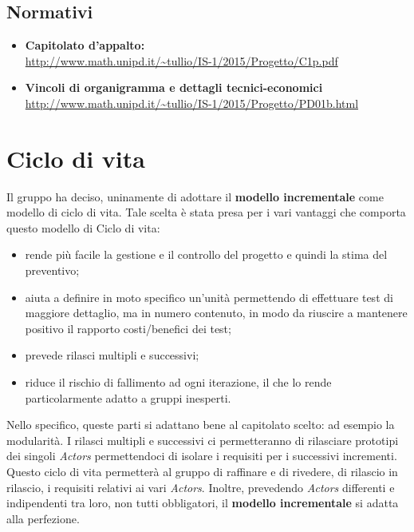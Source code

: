\documentclass[a4paper]{report}
\begin{document}
			\subsection{Normativi}
				\begin{itemize}
					\item \textbf{Capitolato d'appalto: } \\ \url{http://www.math.unipd.it/~tullio/IS-1/2015/Progetto/C1p.pdf}
					\item \textbf{Vincoli di organigramma e dettagli tecnici-economici} \\ 
					\url{http://www.math.unipd.it/~tullio/IS-1/2015/Progetto/PD01b.html}
				\end{itemize}
		\section{Ciclo di vita}
			Il gruppo ha deciso, uninamente di adottare il \textbf{modello incrementale} come modello di ciclo di vita.
			Tale scelta è stata presa per i vari vantaggi che comporta questo modello di Ciclo di vita:
			\begin{itemize}
				\item rende più facile la gestione e il controllo del progetto e quindi la stima del preventivo;
				\item aiuta a definire in moto specifico un'unità permettendo di effettuare test di maggiore dettaglio, ma 
				in numero contenuto, in modo da riuscire a mantenere positivo il rapporto costi/benefici dei test;
				\item prevede rilasci multipli e successivi;
				\item riduce il rischio di fallimento ad ogni iterazione, il che lo rende particolarmente adatto a gruppi 
				inesperti.
			\end{itemize}
			
			Nello specifico, queste parti si adattano bene al capitolato scelto: ad esempio la modularità. I rilasci 
			multipli e successivi ci permetteranno di rilasciare prototipi dei singoli \emph{Actors} permettendoci di
			isolare i requisiti per i successivi incrementi. Questo ciclo di vita permetterà al gruppo di raffinare e 
			di rivedere, di rilascio in rilascio, i requisiti relativi ai vari \emph{Actors}. Inoltre, prevedendo 
			\emph{Actors} differenti e indipendenti tra loro, non tutti obbligatori, il \textbf{modello incrementale} 
			si adatta alla perfezione.
			
\end{document}
